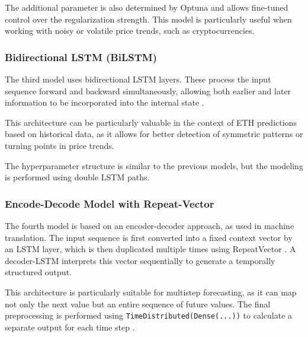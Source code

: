 The additional parameter is also determined by Optuna and allows fine-tuned control over the regularization strength.
This model is particularly useful when working with noisy or volatile price trends, such as cryptocurrencies.



\subsubsection{Bidirectional LSTM (BiLSTM)}

The third model uses bidirectional LSTM layers.
These process the input sequence forward and backward simultaneously, allowing both earlier and later information to be incorporated into the internal state \cite{bi-lstm}.

This architecture can be particularly valuable in the context of ETH predictions based on historical data, as it allows for better detection of symmetric patterns or turning points in price trends.

The hyperparameter structure is similar to the previous models, but the modeling is performed using double LSTM paths.



\subsubsection{Encode-Decode Model with Repeat-Vector}

The fourth model is based on an encoder-decoder approach, as used in machine translation.
The input sequence is first converted into a fixed context vector by an LSTM layer, which is then duplicated multiple times using RepeatVector \cite{keras-repeat-vector}.
A decoder-LSTM interprets this vector sequentially to generate a temporally structured output.

This architecture is particularly suitable for multistep forecasting, as it can map not only the next value but an entire sequence of future values.
The final preprocessing is performed using \verb|TimeDistributed(Dense(...))| to calculate a separate output for each time step \cite{keras-time-distributed}.



